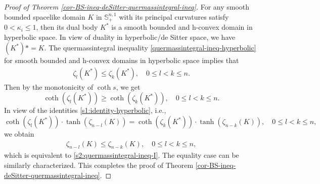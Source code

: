 \documentclass[11pt,reqno]{amsart}
\theoremstyle{definition}
\theoremstyle{remark}
\numberwithin{equation}{section}
\renewcommand{\(}{\left(}
\renewcommand{\)}{\right)}
\renewcommand{\~}{\tilde}
\renewcommand{\-}{\overline}
\renewcommand{\k}{\kappa}
\begin{document}
\begin{proof}[Proof of Theorem \ref{cor-BS-ineq-deSitter-quermassintegral-ineq}]
	For any smooth bounded spacelike domain $K$ in $\mathbb S^{n,1}_{+}$ with its principal curvatures satisfy $0<\k_i\leq 1$, then its dual body $K^\ast$ is a smooth bounded and h-convex domain in hyperbolic space. In view of duality in hyperbolic/de Sitter space, we have $(K^\ast)\ast=K$. The quermassintegral inequality \eqref{quermassintegral-ineq-hyperbolic} for smooth bounded and h-convex domains in hyperbolic space implies that
	\begin{align*}
	\zeta_{l}(K^\ast) \leq \zeta_{k}(K^\ast), \quad 0\leq l<k\leq n.
	\end{align*}
	Then by the monotonicity of $\coth s$, we get
	$$
	\coth(\zeta_{l}(K^\ast)) \geq \coth(\zeta_{k}(K^\ast)), \quad 0\leq l<k\leq n.
	$$
	In view of the identities \eqref{s1:identity-hyperbolic}, i.e.,
	$$
	\coth(\zeta_{l}(K^\ast)) \cdot \tanh(\zeta_{n-l}(K))= \coth(\zeta_{k}(K^\ast)) \cdot \tanh(\zeta_{n-k}(K)), \quad 0\leq l<k\leq n,
	$$
	we obtain
	\begin{align*}
	\zeta_{n-l}(K) \leq \zeta_{n-k}(K), \quad 0\leq l<k\leq n,
	\end{align*}
	which is equivalent to \eqref{s2:quermassintegral-ineq-I}. The equality case can be similarly characterized. This completes the proof of Theorem \ref{cor-BS-ineq-deSitter-quermassintegral-ineq}.
\end{proof}
\end{document}
